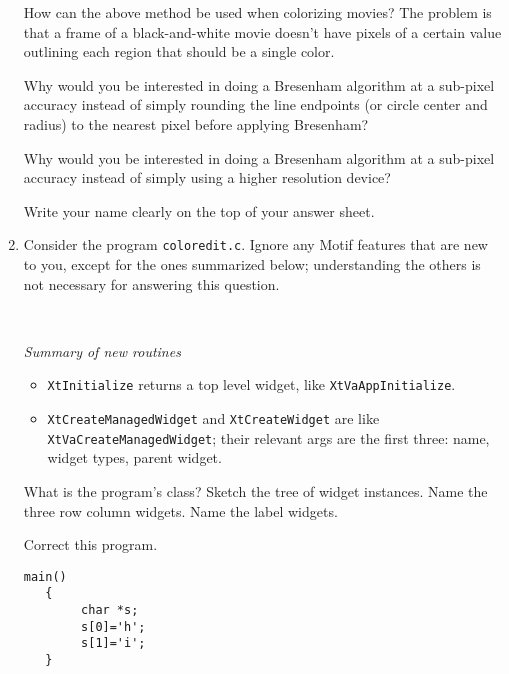 \documentclass[twoside]{article}
\begin{document}
\begin{enumerate}
How can the above method be used when colorizing movies?  The problem is
that a frame of a black-and-white movie doesn't have pixels of a certain
value outlining each region that should be a single color.

  Why would you be interested in doing a Bresenham algorithm at a
sub-pixel accuracy instead of simply rounding the line endpoints (or
circle center and radius) to the nearest pixel before applying
Bresenham?

  Why would you be interested in doing a Bresenham algorithm at a
sub-pixel accuracy instead of simply using a higher resolution device?

 Write your name clearly on the top of your answer sheet.

\item Consider the program \verb+coloredit.c+.  Ignore any
Motif features that are new to you, except for the ones summarized
below; understanding the others is not necessary for answering this
question.


\ \

\noindent \emph{Summary of new routines}
\begin{itemize}

\item \texttt{XtInitialize} returns a top level widget, like
\texttt{XtVaAppInitialize}.
\item \texttt{XtCreateManagedWidget} and \texttt{XtCreateWidget} are like
\texttt{XtVaCreateManagedWidget}; their relevant args are the first three: name,
widget types, parent widget.
\end{itemize}
\begin{enumerate}
 What is the program's class?
 Sketch the tree of widget instances.
 Name the three row column widgets.
 Name the label widgets.
\end{enumerate}

 Correct this program.
\begin{verbatim}
main()
   {
        char *s;
        s[0]='h';
        s[1]='i';
   }
\end{verbatim}



\end{enumerate}
\end{document}
